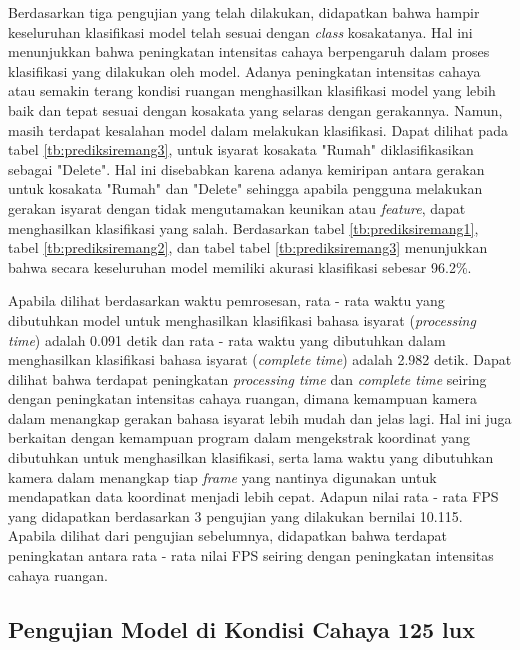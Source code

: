 Berdasarkan tiga pengujian yang telah dilakukan, didapatkan bahwa hampir keseluruhan klasifikasi model telah sesuai dengan \emph{class} kosakatanya. Hal ini menunjukkan bahwa peningkatan intensitas cahaya berpengaruh dalam proses klasifikasi yang dilakukan oleh model. Adanya peningkatan intensitas cahaya atau semakin terang kondisi ruangan menghasilkan klasifikasi model yang lebih baik dan tepat sesuai dengan kosakata yang selaras dengan gerakannya. Namun, masih terdapat kesalahan model dalam melakukan klasifikasi. Dapat dilihat pada tabel \ref{tb:prediksiremang3}, untuk isyarat kosakata "Rumah" diklasifikasikan sebagai "Delete". Hal ini disebabkan karena adanya kemiripan antara gerakan untuk kosakata "Rumah" dan "Delete" sehingga apabila pengguna melakukan gerakan isyarat dengan tidak mengutamakan keunikan atau \emph{feature}, dapat menghasilkan klasifikasi yang salah. Berdasarkan tabel \ref{tb:prediksiremang1}, tabel \ref{tb:prediksiremang2}, dan tabel tabel \ref{tb:prediksiremang3} menunjukkan bahwa secara keseluruhan model memiliki akurasi klasifikasi sebesar 96.2\%.

Apabila dilihat berdasarkan waktu pemrosesan, rata - rata waktu yang dibutuhkan model untuk menghasilkan klasifikasi bahasa isyarat (\emph{processing time}) adalah 0.091 detik dan rata - rata waktu yang dibutuhkan dalam menghasilkan klasifikasi bahasa isyarat (\emph{complete time}) adalah 2.982  detik. Dapat dilihat bahwa terdapat peningkatan \emph{processing time} dan \emph{complete time} seiring dengan peningkatan intensitas cahaya ruangan, dimana kemampuan kamera dalam menangkap gerakan bahasa isyarat lebih mudah dan jelas lagi. Hal ini juga berkaitan dengan kemampuan program dalam mengekstrak koordinat yang dibutuhkan untuk menghasilkan klasifikasi, serta lama waktu yang dibutuhkan kamera dalam menangkap tiap \emph{frame} yang nantinya digunakan untuk mendapatkan data koordinat menjadi lebih cepat. Adapun nilai rata - rata FPS yang didapatkan berdasarkan 3 pengujian yang dilakukan bernilai 10.115. Apabila dilihat dari pengujian sebelumnya, didapatkan bahwa terdapat peningkatan antara rata - rata nilai FPS seiring dengan peningkatan intensitas cahaya ruangan.

\subsection{Pengujian Model di Kondisi Cahaya 125 lux}
\label{sec:analisiscahaya3}

